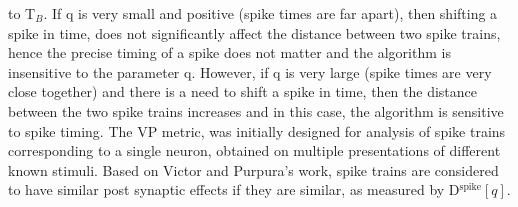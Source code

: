 to T$_{B}$.
If q is very small and positive (spike times are far apart), then shifting a spike in time, does not significantly affect the distance between two spike trains, hence the precise timing of a spike does not matter and the algorithm is insensitive to the parameter q.
However, if q is very large (spike times are very close together) and there is  a need to shift a spike in time, then the distance between the two spike trains 
increases and in this case, the algorithm is sensitive to spike timing.
The VP metric, was initially designed for analysis of spike trains corresponding to a single neuron, obtained on multiple presentations of different known stimuli. Based on Victor and Purpura's work, spike trains are considered to have similar post synaptic effects if they are similar, as measured by D$^{\text{spike}}[q]$.



